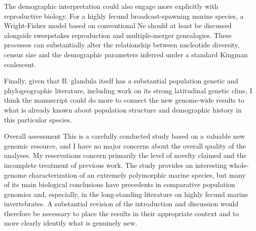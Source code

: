 
\begin{point}{} %
The demographic interpretation could also engage more explicitly with
reproductive biology. For a highly fecund broadcast-spawning marine
species, a Wright-Fisher model based on conventional Ne should at least
be discussed alongside sweepstakes reproduction and multiple-merger
genealogies. These processes can substantially alter the relationship
between nucleotide diversity, census size and the demographic parameters
inferred under a standard Kingman coalescent.
\end{point}


\begin{point}{} %
Finally, given that B. glandula itself has a substantial population
genetic and phylogeographic literature, including work on its strong
latitudinal genetic cline, I think the manuscript could do more to
connect the new genome-wide results to what is already known about
population structure and demographic history in this particular species.
\end{point}


\begin{point}{Overall assessment}
This is a carefully conducted study based on a valuable new genomic
resource, and I have no major concerns about the overall quality of the
analyses. My reservations concern primarily the level of novelty claimed
and the incomplete treatment of previous work. The study provides an
interesting whole-genome characterization of an extremely polymorphic
marine species, but many of its main biological conclusions have
precedents in comparative population genomics and, especially, in the
long-standing literature on highly fecund marine invertebrates. A
substantial revision of the introduction and discussion would therefore
be necessary to place the results in their appropriate context and to
more clearly identify what is genuinely new.
\end{point}

